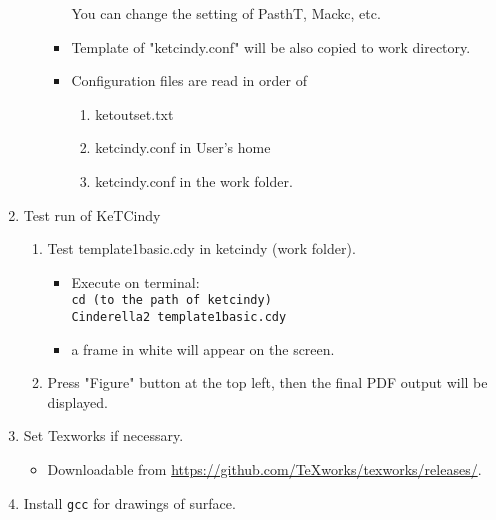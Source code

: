 \documentclass{article}
\begin{document}
\begin{enumerate}[\bf\large 1.]
\begin{enumerate}[(1)]
\begin{itemize}
    \hspace*{10mm}You can change the setting of PasthT, Mackc, etc.
    \item Template of "ketcindy.conf" will be also copied to work directory.
    \item Configuration files are read in order of 
      \begin{enumerate}[1)]
      \item ketoutset.txt
      \item ketcindy.conf in User's home
      \item ketcindy.conf in the work folder.
      \end{enumerate}
    \end{itemize}
  \end{enumerate}

\item Test run of KeTCindy
\begin{enumerate}[(1)]
  \item Test template1basic.cdy in ketcindy (work folder).
    \begin{itemize}
    \item Execute on terminal:\\
      \hspace*{10mm}\verb|cd (to the path of ketcindy)|\\
      \hspace*{10mm}\verb|Cinderella2 template1basic.cdy|
    \item a frame in white will appear on the screen.
    \end{itemize}
  \item Press "Figure" button at the top left, then the final PDF output will be displayed. 
 \end{enumerate}

\item Set Texworks if necessary. 
  \begin{itemize}
  \item Downloadable from \url{https://github.com/TeXworks/texworks/releases/}.
  \end{itemize}

\item Install \verb|gcc| for drawings of surface.

\end{enumerate}
\end{document}
